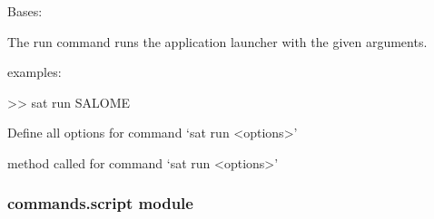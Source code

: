 \documentclass[a4paper,10pt,english]{sphinxmanual}
\begin{document}
\begin{fulllineitems}
\label{\detokenize{apidoc_commands/commands:commands.run.Command}}
Bases: 

The run command runs the application launcher with the given arguments.

\begin{DUlineblock}{0em}
\item[] examples:
\item[] \textgreater{}\textgreater{} sat run SALOME
\end{DUlineblock}

\begin{fulllineitems}
\label{\detokenize{apidoc_commands/commands:commands.run.Command.getParser}}
Define all options for command ‘sat run \textless{}options\textgreater{}’

\end{fulllineitems}


\begin{fulllineitems}
\label{\detokenize{apidoc_commands/commands:commands.run.Command.name}}
\end{fulllineitems}


\begin{fulllineitems}
\label{\detokenize{apidoc_commands/commands:commands.run.Command.run}}
method called for command ‘sat run \textless{}options\textgreater{}’

\end{fulllineitems}


\end{fulllineitems}



\subsubsection{commands.script module}
\label{\detokenize{apidoc_commands/commands:module-commands.script}}\label{\detokenize{apidoc_commands/commands:commands-script-module}}
\end{document}
